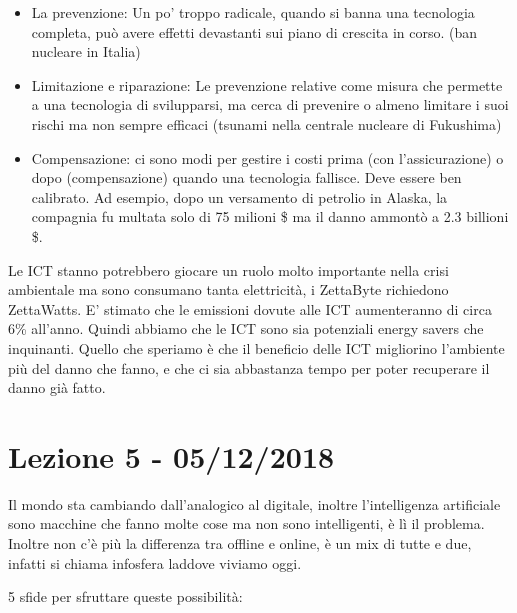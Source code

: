 \documentclass[]{article}
\begin{document}
\begin{itemize}
	 
	\item
	La prevenzione: Un po' troppo radicale, quando si banna una tecnologia
	completa, può avere effetti devastanti sui piano di crescita in corso.
	(ban nucleare in Italia)
	\item
	Limitazione e riparazione: Le prevenzione relative come misura che
	permette a una tecnologia di svilupparsi, ma cerca di prevenire o
	almeno limitare i suoi rischi ma non sempre efficaci (tsunami nella
	centrale nucleare di Fukushima)
	\item
	Compensazione: ci sono modi per gestire i costi prima (con
	l'assicurazione) o dopo (compensazione) quando una tecnologia
	fallisce. Deve essere ben calibrato. Ad esempio, dopo un versamento di
	petrolio in Alaska, la compagnia fu multata solo di 75 milioni \$ ma
	il danno ammontò a 2.3 billioni \$.
\end{itemize}

Le ICT stanno potrebbero giocare un ruolo molto importante nella crisi
ambientale ma sono consumano tanta elettricità, i ZettaByte richiedono
ZettaWatts. E' stimato che le emissioni dovute alle ICT aumenteranno di
circa 6\% all'anno. Quindi abbiamo che le ICT sono sia potenziali energy
savers che inquinanti. Quello che speriamo è che il beneficio delle ICT
migliorino l'ambiente più del danno che fanno, e che ci sia abbastanza
tempo per poter recuperare il danno già fatto.
\section*{Lezione 5 - 05/12/2018}

Il mondo sta cambiando dall'analogico al digitale, inoltre
l'intelligenza artificiale sono macchine che fanno molte cose ma non
sono intelligenti, è lì il problema. Inoltre non c'è più la differenza
tra offline e online, è un mix di tutte e due, infatti si chiama
infosfera laddove viviamo oggi.

5 sfide per sfruttare queste possibilità:
\end{document}
